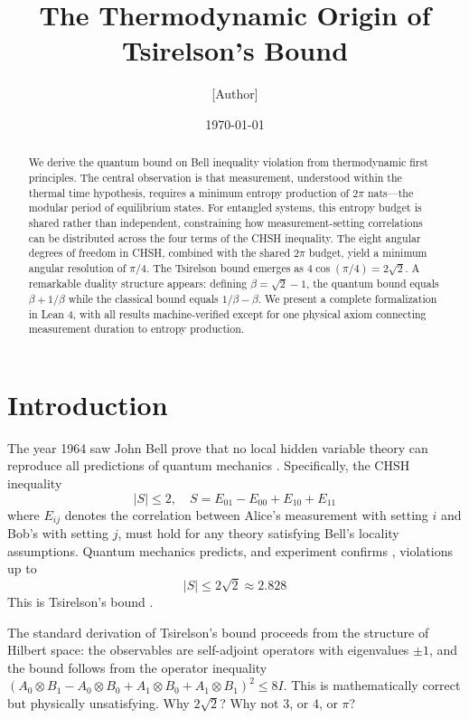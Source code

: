 \documentclass[12pt,a4paper]{article}
\title{The Thermodynamic Origin of Tsirelson's Bound}
\author{[Author]}
\date{\today}
\begin{document}
\maketitle

\begin{abstract}
We derive the quantum bound on Bell inequality violation from thermodynamic first principles. The central observation is that measurement, understood within the thermal time hypothesis, requires a minimum entropy production of $2\pi$ nats—the modular period of equilibrium states. For entangled systems, this entropy budget is shared rather than independent, constraining how measurement-setting correlations can be distributed across the four terms of the CHSH inequality. The eight angular degrees of freedom in CHSH, combined with the shared $2\pi$ budget, yield a minimum angular resolution of $\pi/4$. The Tsirelson bound emerges as $4\cos(\pi/4) = 2\sqrt{2}$. A remarkable duality structure appears: defining $\beta = \sqrt{2} - 1$, the quantum bound equals $\beta + 1/\beta$ while the classical bound equals $1/\beta - \beta$. We present a complete formalization in Lean 4, with all results machine-verified except for one physical axiom connecting measurement duration to entropy production.
\end{abstract}

\section{Introduction}

The year 1964 saw John Bell prove that no local hidden variable theory can reproduce all predictions of quantum mechanics \cite{Bell1964}. Specifically, the CHSH inequality \cite{CHSH1969}
\begin{equation}
|S| \leq 2, \quad S = E_{01} - E_{00} + E_{10} + E_{11}
\end{equation}
where $E_{ij}$ denotes the correlation between Alice's measurement with setting $i$ and Bob's with setting $j$, must hold for any theory satisfying Bell's locality assumptions. Quantum mechanics predicts, and experiment confirms \cite{Aspect1982,Hensen2015}, violations up to
\begin{equation}
|S| \leq 2\sqrt{2} \approx 2.828
\end{equation}
This is Tsirelson's bound \cite{Tsirelson1980}.

The standard derivation of Tsirelson's bound proceeds from the structure of Hilbert space: the observables are self-adjoint operators with eigenvalues $\pm 1$, and the bound follows from the operator inequality $(A_0 \otimes B_1 - A_0 \otimes B_0 + A_1 \otimes B_0 + A_1 \otimes B_1)^2 \leq 8I$. This is mathematically correct but physically unsatisfying. Why $2\sqrt{2}$? Why not 3, or 4, or $\pi$?
\end{document}
